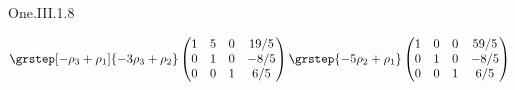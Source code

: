 \begin{ans}{One.III.1.8}
\begin{exparts}
\begin{multline*}
            \grstep[-\rho_3+\rho_1]{-3\rho_3+\rho_2}
            \begin{pmatrix}
              1  &5  &0  &19/5  \\
              0  &1  &0  &-8/5  \\
              0  &0  &1  &6/5
            \end{pmatrix}
            \grstep{-5\rho_2+\rho_1}
            \begin{pmatrix}
              1  &0  &0  &59/5  \\
              0  &1  &0  &-8/5  \\
              0  &0  &1  &6/5
            \end{pmatrix}
          \end{multline*}
      \end{exparts}
    
\end{ans}
